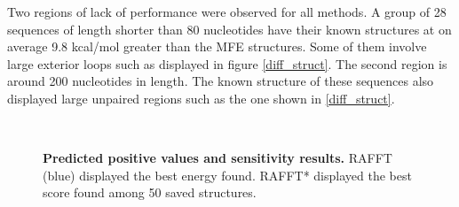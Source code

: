\documentclass[a4paper,12pt]{article}
\begin{document}
{{Two regions of lack of performance were observed for all methods. A group of 28
sequences of length shorter than 80 nucleotides have their known structures at
on average 9.8 kcal/mol greater than the MFE structures. Some of them involve
large exterior loops such as displayed in figure \ref{diff_struct}. The second
region is around 200 nucleotides in length. The known structure of these
sequences also displayed large unpaired regions such as the one shown in
\ref{diff_struct}.

\begin{figure}[!ht]
  \centering
  \\
  \caption{\textbf{Predicted positive values and sensitivity results\label{perf_fig}.}
  RAFFT (blue) displayed the best energy found. RAFFT* displayed the best score found among
50 saved structures.}
\end{figure}

}}
\end{document}
